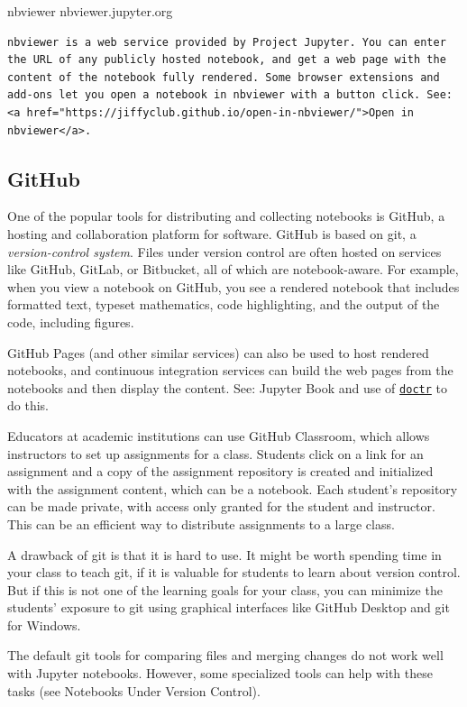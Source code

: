 \documentclass[]{book}
\begin{document}
nbviewer nbviewer.jupyter.org

\begin{verbatim}
nbviewer is a web service provided by Project Jupyter. You can enter the URL of any publicly hosted notebook, and get a web page with the content of the notebook fully rendered. Some browser extensions and add-ons let you open a notebook in nbviewer with a button click. See: <a href="https://jiffyclub.github.io/open-in-nbviewer/">Open in nbviewer</a>.
\end{verbatim}

\subsection{GitHub}\label{github}

One of the popular tools for distributing and collecting notebooks is
GitHub, a hosting and collaboration platform for software. GitHub is
based on git, a \emph{version-control system}. Files under version
control are often hosted on services like GitHub, GitLab, or Bitbucket,
all of which are notebook-aware. For example, when you view a notebook
on GitHub, you see a rendered notebook that includes formatted text,
typeset mathematics, code highlighting, and the output of the code,
including figures.

GitHub Pages (and other similar services) can also be used to host
rendered notebooks, and continuous integration services can build the
web pages from the notebooks and then display the content. See: Jupyter
Book and use of \href{https://drdoctr.github.io/doctr}{\texttt{doctr}}
to do this.

Educators at academic institutions can use GitHub Classroom, which
allows instructors to set up assignments for a class. Students click on
a link for an assignment and a copy of the assignment repository is
created and initialized with the assignment content, which can be a
notebook. Each student's repository can be made private, with access
only granted for the student and instructor. This can be an efficient
way to distribute assignments to a large class.

A drawback of git is that it is hard to use. It might be worth spending
time in your class to teach git, if it is valuable for students to learn
about version control. But if this is not one of the learning goals for
your class, you can minimize the students' exposure to git using
graphical interfaces like GitHub Desktop and git for Windows.

The default git tools for comparing files and merging changes do not
work well with Jupyter notebooks. However, some specialized tools can
help with these tasks (see Notebooks Under Version Control).
\end{document}
